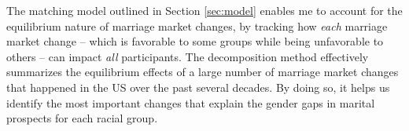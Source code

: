 
 The matching model outlined in Section \ref{sec:model} enables me to account for the equilibrium nature of marriage market changes, by tracking how \textit{each} marriage market change -- which is favorable to some groups while being unfavorable to others --  can impact \textit{all} participants. The decomposition method effectively summarizes the equilibrium effects of a large number of marriage market changes that happened in the US over the past several decades. By doing so, it helps us identify the most important changes that explain the gender gaps in marital prospects for each racial group. 




